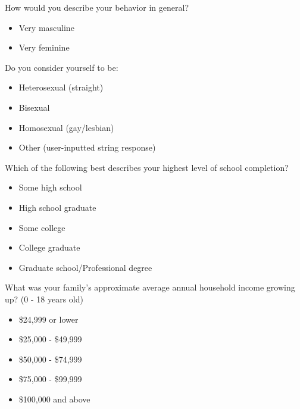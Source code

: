 \documentclass[twoside]{report}
\begin{document}
\begin{multicols}{2}
 How would you describe your behavior in general?

 \begin{itemize}
  \item
        Very masculine
 \end{itemize}

 \begin{itemize}
  \item
        Very feminine
 \end{itemize}

 Do you consider yourself to be:

 \begin{itemize}
  \item
        Heterosexual (straight)
 \end{itemize}

 \begin{itemize}
  \item
        Bisexual
  \item
        Homosexual (gay/lesbian)
  \item
        Other (user-inputted string response)
 \end{itemize}

 Which of the following best describes your highest level of school completion?

 \begin{itemize}
  \item
        Some high school
 \end{itemize}

 \begin{itemize}
  \item
        High school graduate
  \item
        Some college
  \item
        College graduate
  \item
        Graduate school/Professional degree
 \end{itemize}

 What was your family's approximate average annual household income growing up? (0 - 18 years old)

 \begin{itemize}
  \item
        \$24,999 or lower
 \end{itemize}

 \begin{itemize}
  \item
        \$25,000 - \$49,999
  \item
        \$50,000 - \$74,999
  \item
        \$75,000 - \$99,999
  \item
        \$100,000 and above
 \end{itemize}


\end{multicols}
\end{document}
